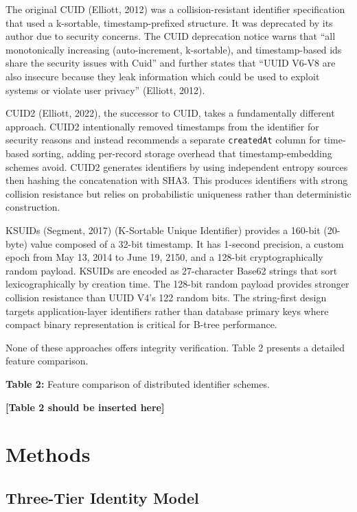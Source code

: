 \documentclass[fleqn,10pt,lineno]{wlpeerj}
\begin{document}
The original CUID (Elliott, 2012) was a collision-resistant identifier
specification that used a k-sortable, timestamp-prefixed structure. It
was deprecated by its author due to security concerns. The CUID
deprecation notice warns that ``all monotonically increasing
(auto-increment, k-sortable), and timestamp-based ids share the security
issues with Cuid'' and further states that ``UUID V6-V8 are also
insecure because they leak information which could be used to exploit
systems or violate user privacy'' (Elliott, 2012).

CUID2 (Elliott, 2022), the successor to CUID, takes a fundamentally
different approach. CUID2 intentionally removed timestamps from the
identifier for security reasons and instead recommends a separate
\texttt{createdAt} column for time-based sorting, adding per-record
storage overhead that timestamp-embedding schemes avoid. CUID2 generates
identifiers by using independent entropy sources then hashing the
concatenation with SHA3. This produces identifiers with strong collision
resistance but relies on probabilistic uniqueness rather than
deterministic construction.

KSUIDs (Segment, 2017) (K-Sortable Unique Identifier) provides a 160-bit
(20-byte) value composed of a 32-bit timestamp. It has 1-second
precision, a custom epoch from May 13, 2014 to June 19, 2150, and a
128-bit cryptographically random payload. KSUIDs are encoded as
27-character Base62 strings that sort lexicographically by creation
time. The 128-bit random payload provides stronger collision resistance
than UUID V4's 122 random bits. The string-first design targets
application-layer identifiers rather than database primary keys where
compact binary representation is critical for B-tree performance.

None of these approaches offers integrity verification. Table 2 presents
a detailed feature comparison.

\textbf{Table 2:} Feature comparison of distributed identifier schemes.

\textbf{{[}Table 2 should be inserted here{]}}

\newpage

\section{Methods}\label{methods}

\subsection{Three-Tier Identity Model}\label{three-tier-identity-model}
\end{document}
